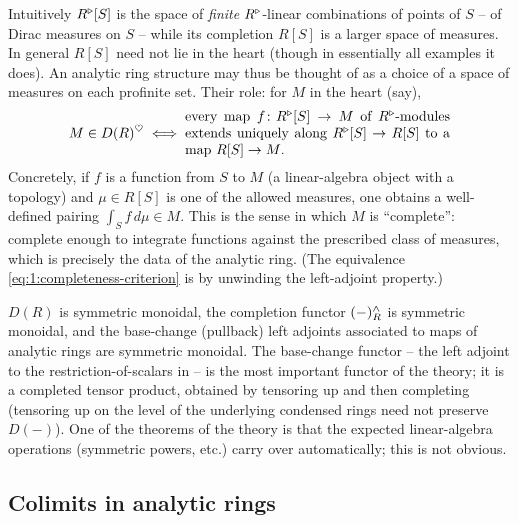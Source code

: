 \begin{remark}
\label{rmk:1:measures}
Intuitively $R^{\triangleright}[S]$ is the space of \emph{finite} $R^{\triangleright}$-linear
combinations of points of $S$ -- of Dirac measures on $S$ -- while its
completion $R[S]$ is a larger space of measures. In general $R[S]$ need not lie
in the heart (though in essentially all examples it does). An analytic ring
structure may thus be thought of as a choice of a space of measures on each
profinite set. Their role: for $M$ in the heart (say),
\begin{equation}
\label{eq:1:completeness-criterion}
M\in D(R)^{\heartsuit}\iff
\parbox{0.55\textwidth}{every map $f\colon\ur{R}[S]\to M$ of $\ur{R}$-modules
extends uniquely along $\ur{R}[S]\to R[S]$ to a map $R[S]\to M$.}
\end{equation}
Concretely, if $f$ is a function from $S$ to $M$ (a linear-algebra object with a
topology) and $\mu\in R[S]$ is one of the allowed measures, one obtains a
well-defined pairing $\int_S f\,d\mu\in M$. This is the sense in which $M$ is
``complete'': complete enough to integrate functions against the prescribed
class of measures, which is precisely the data of the analytic ring. (The
equivalence \eqref{eq:1:completeness-criterion} is by unwinding the left-adjoint
property.)
\end{remark}

\begin{remark}
\label{rmk:1:monoidal}
$D(R)$ is symmetric monoidal, the completion functor $(-)^{\wedge}_R$ is symmetric
monoidal, and the base-change (pullback) left adjoints associated to maps of
analytic rings are symmetric monoidal. The base-change functor -- the left
adjoint to the restriction-of-scalars in  -- is
the most important functor of the theory; it is a completed tensor product,
obtained by tensoring up and then completing (tensoring up on the level of the
underlying condensed rings need not preserve $D(-)$). One of the theorems of the
theory is that the expected linear-algebra operations (symmetric powers, etc.)
carry over automatically; this is not obvious.
\end{remark}

\subsection{Colimits in analytic rings}

